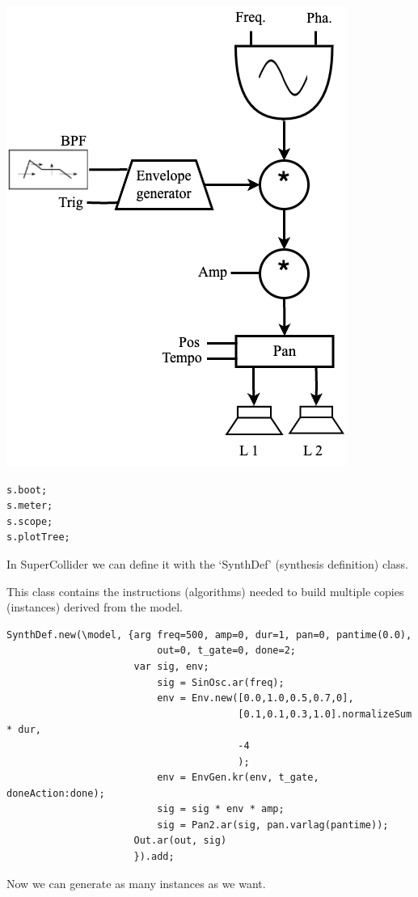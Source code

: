\begin{center}
\includegraphics[scale=0.35]{../img/modello.png}
\end{center}

\begin{lstlisting}[frame=single] 
s.boot;
s.meter;
s.scope;
s.plotTree;
\end{lstlisting}

In SuperCollider we can define it with the `SynthDef' (synthesis definition) class.

This class contains the instructions (algorithms) needed to build multiple copies (instances) derived from the model.

\begin{lstlisting}[frame=single, caption=Instrument model] 
SynthDef.new(\model, {arg freq=500, amp=0, dur=1, pan=0, pantime(0.0), 
                          out=0, t_gate=0, done=2;
                      var sig, env;
                          sig = SinOsc.ar(freq);
                          env = Env.new([0.0,1.0,0.5,0.7,0],                
                                        [0.1,0.1,0.3,1.0].normalizeSum * dur,
                                        -4    
                                        );
                          env = EnvGen.kr(env, t_gate, doneAction:done);
                          sig = sig * env * amp;
                          sig = Pan2.ar(sig, pan.varlag(pantime));
                      Out.ar(out, sig)
                      }).add;        
\end{lstlisting}
Now we can generate as many instances as we want.

